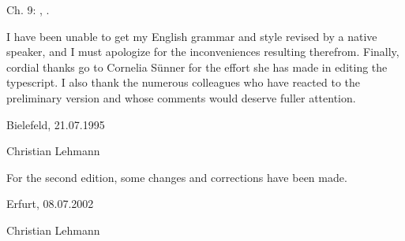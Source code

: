 Ch. 9:    \citet{Lehmann1993}, \citet{Lehmann1995}.

I have been unable to get my English grammar and style revised by a native speaker, and I must apologize for the inconveniences resulting therefrom. Finally, cordial thanks go to Cornelia Sünner for the effort she has made in editing the typescript. I also thank the numerous colleagues who have reacted to the preliminary version and whose comments would deserve fuller attention.

\vspace{\baselineskip}

\begin{minipage}{.45\linewidth}
	\begin{flushleft}
		\noindent Bielefeld, 21.07.1995
	\end{flushleft}
\end{minipage}
\begin{minipage}{.45\linewidth}
	\begin{flushright}
		Christian Lehmann
	\end{flushright}
\end{minipage}

\vspace{\baselineskip}

\noindent For the second edition, some changes and corrections have been made.

\vspace{\baselineskip}

\begin{minipage}{.45\linewidth}
	\begin{flushleft}
		\noindent Erfurt, 08.07.2002
	\end{flushleft}
\end{minipage}
\begin{minipage}{.45\linewidth}
	\begin{flushright}
		Christian Lehmann
	\end{flushright}
\end{minipage}

